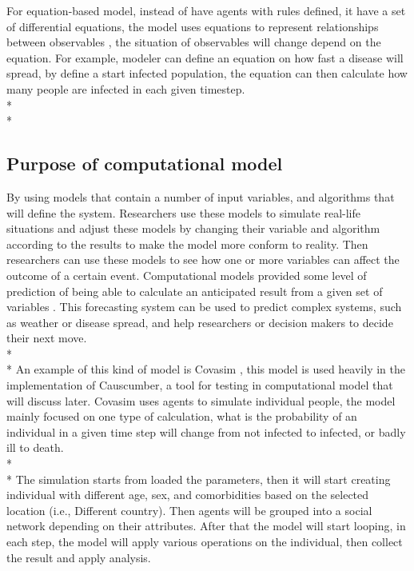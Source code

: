 For equation-based model, instead of have agents with rules defined, it have a set of differential equations, the model uses equations to represent relationships between observables \cite{Reference7}, the situation of observables will change depend on the equation. For example, modeler can define an equation on how fast a disease will spread, by define a start infected population, the equation can then calculate how many people are infected in each given timestep. \\*\\*

\subsection{Purpose of computational model}
By using models that contain a number of input variables, and algorithms that will define the system. Researchers use these models to simulate real-life situations and adjust these models by changing their variable and algorithm according to the results to make the model more conform to reality. Then researchers can use these models to see how one or more variables can affect the outcome of a certain event. Computational models provided some level of prediction of being able to calculate an anticipated result from a given set of variables \cite{Reference8}. This forecasting system can be used to predict complex systems, such as weather or disease spread, and help researchers or decision makers to decide their next move.\\*\\*
An example of this kind of model is Covasim \cite{Reference9}, this model is used heavily in the implementation of Causcumber, a tool for testing in computational model that will discuss later. Covasim uses agents to simulate individual people, the model mainly focused on one type of calculation, what is the probability of an individual in a given time step will change from not infected to infected, or badly ill to death. \\*\\*
The simulation starts from loaded the parameters, then it will start creating individual with different age, sex, and comorbidities based on the selected location (i.e., Different country). Then agents will be grouped into a social network depending on their attributes. After that the model will start looping, in each step, the model will apply various operations on the individual, then collect the result and apply analysis.

